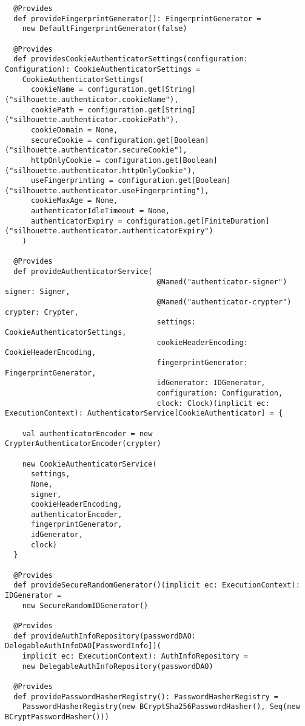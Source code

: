 \begin{lstlisting}
  @Provides
  def provideFingerprintGenerator(): FingerprintGenerator =
    new DefaultFingerprintGenerator(false)

  @Provides
  def providesCookieAuthenticatorSettings(configuration: Configuration): CookieAuthenticatorSettings =
    CookieAuthenticatorSettings(
      cookieName = configuration.get[String]("silhouette.authenticator.cookieName"),
      cookiePath = configuration.get[String]("silhouette.authenticator.cookiePath"),
      cookieDomain = None,
      secureCookie = configuration.get[Boolean]("silhouette.authenticator.secureCookie"),
      httpOnlyCookie = configuration.get[Boolean]("silhouette.authenticator.httpOnlyCookie"),
      useFingerprinting = configuration.get[Boolean]("silhouette.authenticator.useFingerprinting"),
      cookieMaxAge = None,
      authenticatorIdleTimeout = None,
      authenticatorExpiry = configuration.get[FiniteDuration]("silhouette.authenticator.authenticatorExpiry")
    )

  @Provides
  def provideAuthenticatorService(
                                   @Named("authenticator-signer") signer: Signer,
                                   @Named("authenticator-crypter") crypter: Crypter,
                                   settings: CookieAuthenticatorSettings,
                                   cookieHeaderEncoding: CookieHeaderEncoding,
                                   fingerprintGenerator: FingerprintGenerator,
                                   idGenerator: IDGenerator,
                                   configuration: Configuration,
                                   clock: Clock)(implicit ec: ExecutionContext): AuthenticatorService[CookieAuthenticator] = {

    val authenticatorEncoder = new CrypterAuthenticatorEncoder(crypter)

    new CookieAuthenticatorService(
      settings,
      None,
      signer,
      cookieHeaderEncoding,
      authenticatorEncoder,
      fingerprintGenerator,
      idGenerator,
      clock)
  }

  @Provides
  def provideSecureRandomGenerator()(implicit ec: ExecutionContext): IDGenerator =
    new SecureRandomIDGenerator()

  @Provides
  def provideAuthInfoRepository(passwordDAO: DelegableAuthInfoDAO[PasswordInfo])(
    implicit ec: ExecutionContext): AuthInfoRepository =
    new DelegableAuthInfoRepository(passwordDAO)

  @Provides
  def providePasswordHasherRegistry(): PasswordHasherRegistry =
    PasswordHasherRegistry(new BCryptSha256PasswordHasher(), Seq(new BCryptPasswordHasher()))


\end{lstlisting}
